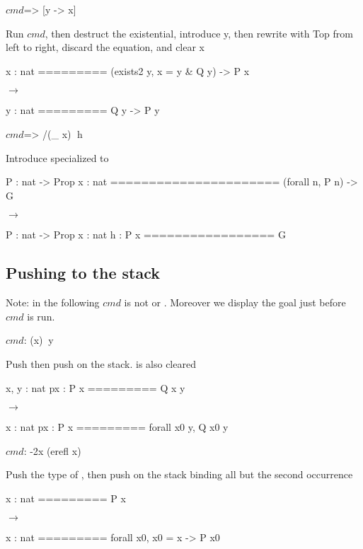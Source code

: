 \begin{landscape}
\begin{small}
\begin{multicols*}{3}[\begin{center}\section*{}\end{center}]
\begin{cheat}
$cmd$=> [y -> {x}]
\end{cheat}
  Run $cmd$, then destruct the existential, introduce y,
  then rewrite with Top from left to right,
  discard the equation, and clear x

\begin{cheatout}
 x : nat
=========
 (exists2 y,
   x = y & Q y) -> P x
\end{cheatout}
$\to$
\begin{cheatout}
 y : nat
=========
 Q y -> P y
$~$
\end{cheatout}

\begin{cheat}
$cmd$=> /(_ x)$\;$ h
\end{cheat}
Introduce  specialized to 


\begin{cheatout}
 P : nat -> Prop
 x : nat
======================
 (forall n, P n) -> G
$~$
\end{cheatout}
$\to$
\begin{cheatout}
 P : nat -> Prop
 x : nat
 h : P x
=================
 G
\end{cheatout}


\subsection*{Pushing to the stack}
Note: in the following $cmd$ is not
 or . Moreover we display the
goal just before $cmd$ is run.

\begin{cheat}
$cmd$: (x)$\;\;$y
\end{cheat}
  Push  then push  on the stack.  is also cleared

\begin{cheatout}
 x, y : nat
 px : P x
=========
 Q x y
\end{cheatout}
$\to$
\begin{cheatout}
 x : nat
 px : P x
=========
 forall x0 y, Q x0 y
\end{cheatout}


\begin{cheat}
$cmd$: {-2}x (erefl x)
\end{cheat}
  Push the type of , then push  on the stack
  binding all but the second occurrence

\begin{cheatout}
 x : nat
=========
 P x
$~$
\end{cheatout}
$\to$
\begin{cheatout}
 x : nat
=========
 forall x0,
  x0 = x -> P x0
\end{cheatout}



\end{multicols*}
\end{small}
\end{landscape}
